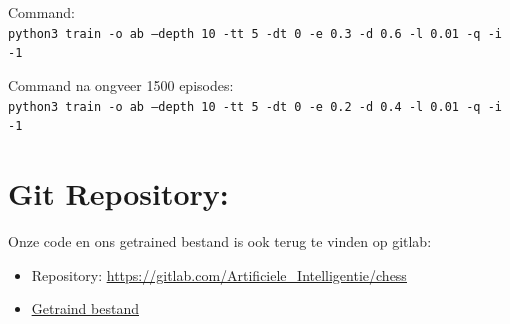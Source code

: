 \documentclass[a4paper,openany]{uantwerpenassignment}
\newcommand{\codeword}[1]{
    \colorbox{code}{\texttt{\textcolor{codetext}{#1}}}
}
\begin{document}
Command:\\
\codeword{python3 train -o ab --depth 10 -tt 5 -dt 0 -e 0.3 -d 0.6 -l 0.01 -q -i -1}

Command na ongveer 1500 episodes:\\
\codeword{python3 train -o ab --depth 10 -tt 5 -dt 0 -e 0.2 -d 0.4 -l 0.01 -q -i -1}

\section{Git Repository:}
Onze code en ons getrained bestand is ook terug te vinden op gitlab: 
\begin{itemize}
    \item Repository: \href{https://gitlab.com/Artificiele_Intelligentie/chess}{\color{blue}\underline{https://gitlab.com/Artificiele\_Intelligentie/chess}}
    \item \href{https://gitlab.com/Artificiele_Intelligentie/chess/-/raw/master/grandQ.json}{\color{blue}\underline{Getraind bestand}}
\end{itemize}



\end{document}
